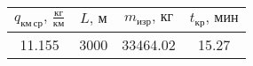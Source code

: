 \begin{tabular}{|c|c|c|c|}
\hline
$q_{км\, ср},\, \frac{кг}{км}$ & $L,\, м$ & $m_{изр},\, кг$ & $t_{кр},\, мин$ \\ 
\hline
11.155 & 3000 & 33464.02 & 15.27 \\ 
\hline
\end{tabular}